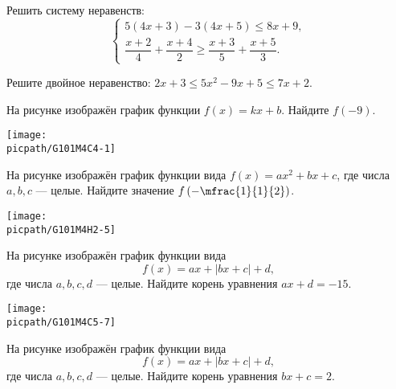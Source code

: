 \begin{class}[number=6]
	\begin{listofex}
		\item Решить систему неравенств:
		\[ \left\{
		\begin{array}{l}
			5(4x+3)-3(4x+5)\le8x+9,\\
			\dfrac{x+2}{4}+\dfrac{x+4}{2}\ge\dfrac{x+3}{5}+\dfrac{x+5}{3}.
		\end{array}
		\right. \]
		\item Решите двойное неравенство: \( 2x+3\le5x^2-9x+5\le7x+2 \).
		\item
		\begin{minipage}[t]{\bodywidth}
			На рисунке изображён график функции \(f(x)=kx+b\). Найдите \(f(-9)\).
		\end{minipage}
		\hspace{0.02\linewidth}
		\begin{minipage}[t]{\picwidth}
			\texttt{[image: \\picpath/G101M4C4-1]}
		\end{minipage}
		\item
		\begin{minipage}[t]{\bodywidth}
			На рисунке изображён график функции вида \(f(x)=ax^2+bx+c\), где числа \(a, b, c\) --- целые. Найдите значение \(f\left( -\mfrac{1}{1}{2} \right)\).
		\end{minipage}
		\hspace{0.02\linewidth}
		\begin{minipage}[t]{\picwidth}
			\texttt{[image: \\picpath/G101M4H2-5]}
		\end{minipage}
		\item
		\begin{minipage}[t]{\bodywidth}
			На рисунке изображён график функции вида \[ f(x)=ax+|bx+c|+d, \] где числа \(a, b, c, d\) --- целые. Найдите корень уравнения \(ax+d=-15\).
		\end{minipage}
		\hspace{0.02\linewidth}
		\begin{minipage}[t]{\picwidth}
			\texttt{[image: \\picpath/G101M4C5-7]}
		\end{minipage}
		\item
		\begin{minipage}[t]{\bodywidth}
			На рисунке изображён график функции вида \[ f(x)=ax+|bx+c|+d, \] где числа \(a, b, c, d\) --- целые. Найдите корень уравнения \(bx+c=2\).
		\end{minipage}
		\hspace{0.02\linewidth}

\end{listofex}
\end{class}

